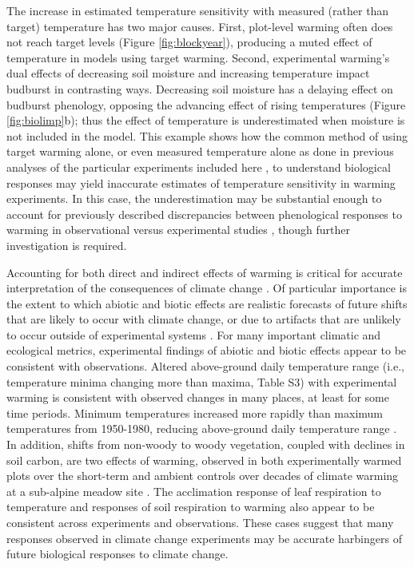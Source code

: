 \documentclass{article}
\begin{document}
\par The increase in estimated temperature sensitivity with measured (rather than target) temperature has two major causes. First, plot-level warming often does not reach target levels (Figure \ref{fig:blockyear}), producing a muted effect of temperature in models using target warming. Second, experimental warming's dual effects of decreasing soil moisture and increasing temperature impact budburst in contrasting ways. 
Decreasing soil moisture has a delaying effect on budburst phenology, opposing the advancing effect of rising temperatures (Figure \ref{fig:biolimp}b); thus the effect of temperature is underestimated when moisture is not included in the model. This example shows how the common method of using target warming alone, or even measured temperature alone as done in previous analyses of the particular experiments included here \citep[exp01, exp03, exp04, exp10,][]{clark2014a,clark2014b,polgar2014,marchin2015}, to understand biological responses may yield inaccurate estimates of temperature sensitivity in warming experiments. In this case, the underestimation may be substantial enough to account for previously described discrepancies between phenological responses to warming in observational versus experimental studies \citep{wolkovich2012,polgar2014}, though further investigation is required. 

\par Accounting for both direct and indirect effects of warming is critical for accurate interpretation of the consequences of climate change \citep{kharouba2015}. Of particular importance is the extent to which abiotic and biotic effects are realistic forecasts of future shifts that are likely to occur with climate change, or due to artifacts that are unlikely to occur outside of experimental systems \citep{hurlbert1984,moise2010,diamond2013}. For many important climatic and ecological metrics, experimental findings of abiotic and biotic effects appear to be consistent with observations. Altered above-ground daily temperature range (i.e., temperature minima changing more than maxima, Table S3) with experimental warming is consistent with observed changes in many places, at least for some time periods. Minimum temperatures increased more rapidly than maximum temperatures from 1950-1980, reducing above-ground daily temperature range \citep[][]{thorne2016,vose2005}. In addition, shifts from non-woody to woody vegetation, coupled with declines in soil carbon, are two effects of warming, observed in both experimentally warmed plots over the short-term and ambient controls over decades of climate warming at a sub-alpine meadow site \citep{harte2015}. The acclimation response of leaf respiration to temperature \citep{aspinwall2016,reich2016} and responses of soil respiration to warming \citep{carey2016} also appear to be consistent across experiments and observations. These cases suggest that many responses observed in climate change experiments may be accurate harbingers of future biological responses to climate change. 
\end{document}
